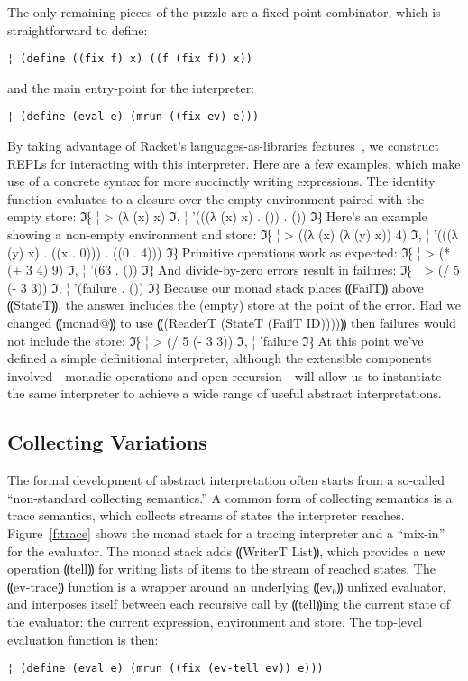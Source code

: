 The only remaining pieces of the puzzle are a fixed-point combinator, which is
straightforward to define:
\begin{lstlisting}
¦ (define ((fix f) x) ((f (fix f)) x))
\end{lstlisting}
and the main entry-point for the interpreter:
\begin{lstlisting}
¦ (define (eval e) (mrun ((fix ev) e)))
\end{lstlisting}
By taking advantage of Racket's languages-as-libraries
features~\cite{dvanhorn:TobinHochstadt2011Languages}, we construct REPLs for
interacting with this interpreter.  Here are a few examples, which make use of
a concrete syntax for more succinctly writing expressions. The identity
function evaluates to a closure over the empty environment paired with the
empty store:
ℑ⁅
¦ > (λ (x) x)
ℑ,
¦ '(((λ (x) x) . ()) . ())
ℑ⁆
Here's an example showing a non-empty environment and store:
ℑ⁅
¦ > ((λ (x) (λ (y) x)) 4)
ℑ,
¦ '(((λ (y) x) . ((x . 0))) . ((0 . 4)))
ℑ⁆
Primitive operations work as expected:
ℑ⁅
¦ > (* (+ 3 4) 9)
ℑ,
¦ '(63 . ())
ℑ⁆
And divide-by-zero errors result in failures:
ℑ⁅
¦ > (/ 5 (- 3 3))
ℑ,
¦ '(failure . ())
ℑ⁆
Because our monad stack places ⸨FailT⸩ above ⸨StateT⸩, the answer includes the
(empty) store at the point of the error. Had we changed ⸨monad@⸩ to use
⸨(ReaderT (StateT (FailT ID))))⸩ then failures would not include the store:
ℑ⁅
¦ > (/ 5 (- 3 3))
ℑ,
¦ 'failure
ℑ⁆
At this point we've defined a simple definitional interpreter, although the
extensible components involved—monadic operations and open recursion—will allow
us to instantiate the same interpreter to achieve a wide range of useful
abstract interpretations.

\subsection{Collecting Variations}\label{s:collecting}

The formal development of abstract interpretation often starts from a so-called
``non-standard collecting semantics.''  A common form of collecting semantics
is a trace semantics, which collects streams of states the interpreter reaches.
Figure~\ref{f:trace} shows the monad stack for a tracing interpreter and a
``mix-in'' for the evaluator.  The monad stack adds ⸨WriterT List⸩, which
provides a new operation ⸨tell⸩ for writing lists of items to the stream of
reached states.  The ⸨ev-trace⸩ function is a wrapper around an underlying
⸨ev₀⸩ unfixed evaluator, and interposes itself between each recursive call by
⸨tell⸩ing the current state of the evaluator: the current expression,
environment and store.  The top-level evaluation function is then:
\begin{lstlisting}
¦ (define (eval e) (mrun ((fix (ev-tell ev)) e)))
\end{lstlisting}

